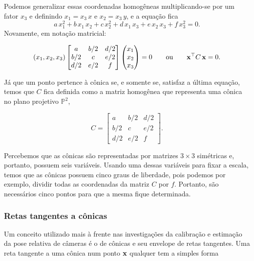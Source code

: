 Podemos generalizar essas coordenadas homogêneas multiplicando-se por um fator $x_3$ e definindo $x_1=x_3\,x$ e $x_2=x_3\,y$, e a equação fica
\begin{equation*}
a\,x_1^2+b\,x_1\,x_2+c\,x_2^2+d\,x_1\,x_3+e\,x_2\,x_3+f\,x_3^2=0.
\end{equation*}
Novamente, em notação matricial:

\begin{equation*}
(x_1,x_2,x_3) 
 \begin{bmatrix}
  a & b/2 & d/2\\
  b/2 & c & e/2\\
  d/2 & e/2 & f
  \end{bmatrix}
 \begin{pmatrix}
  x_1\\
  x_2\\
  x_3
  \end{pmatrix}
 = 0
 \qquad \text{ou} \qquad
 \mathbf{x}^\top C\,\mathbf{x} = 0.
\end{equation*}

Já que um ponto pertence à cônica se, e somente se, satisfaz a última equação, temos que $C$ fica definida como a matriz homogênea que representa uma cônica no plano projetivo $\mathbb{P}^2$,

\begin{equation*}
C =  \begin{bmatrix}
      a & b/2 & d/2\\
      b/2 & c & e/2\\
      d/2 & e/2 & f
      \end{bmatrix}.
\end{equation*}

Percebemos que as cônicas são representadas por matrizes $3\times3$ simétricas e, portanto, possuem seis variáveis. Usando uma dessas variáveis para fixar a escala, temos que as cônicas possuem cinco graus de liberdade, pois podemos por exemplo, dividir todas as coordenadas da matriz $C$ por $f$. Portanto, são necessários cinco pontos para que a mesma fique determinada.  \\

\subsubsection*{Retas tangentes a cônicas} 

Um conceito utilizado mais à frente nas investigações da calibração e estimação da pose relativa de câmeras é o de cônicas e seu envelope de retas tangentes. Uma reta tangente a uma cônica num ponto $\mathbf{x}$ qualquer tem a simples forma

